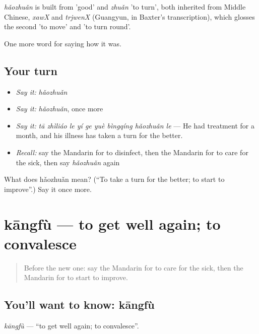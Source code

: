 \begin{cousinweb}
\emph{hǎozhuǎn} is built from  'good' and \emph{zhuǎn} 'to turn', both inherited from Middle Chinese, \emph{xawX} and \emph{trjwenX} (Guangyun, in Baxter's transcription), which glosses the second 'to move' and 'to turn round'.
\end{cousinweb}

\begin{grammarlens}[title={What you've built}]
One more word for saying how it was.
\end{grammarlens}

\subsection*{Your turn}
\begin{itemize}
\raggedright
  \item \emph{Say it:} \emph{hǎozhuǎn}
  \item \emph{Say it:} \emph{hǎozhuǎn}, once more
  \item \emph{Say it:} \emph{tā zhìliáo le yí ge yuè bìngqíng hǎozhuǎn le} — He had treatment for a month, and his illness has taken a turn for the better.
  \item \emph{Recall:} say the Mandarin for to disinfect, then the Mandarin for to care for the sick, then say \emph{hǎozhuǎn} again
\end{itemize}

\begin{tcolorbox}[breakable,colback=teal!4,colframe=teal!35!black,title={Before you move on}]
What does hǎozhuǎn mean? (\textquotedblleft{}To take a turn for the better; to start to improve\textquotedblright{}.) Say it once more.
\end{tcolorbox}
\section[kāngfù]{kāngfù — to get well again; to convalesce}

\label{lesson:ZH-C483-kangfu}



\begin{quote}
Before the new one: say the Mandarin for to care for the sick, then the Mandarin for to start to improve.
\end{quote}

\subsection*{You'll want to know: kāngfù}
\emph{kāngfù} — \textquotedblleft{}to get well again; to convalesce\textquotedblright{}.

